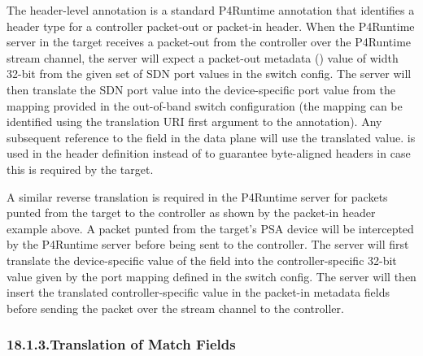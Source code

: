 \documentclass[11pt]{article}
\begin{document}
{%
\noindent{}The header-level annotation  is a standard P4Runtime
annotation that identifies a header type for a controller packet-out or
packet-in header. When the P4Runtime server in the target receives a packet-out
from the controller over the P4Runtime stream channel, the server will expect a
packet-out metadata () value of width 32-bit from the given set of
SDN port values in the switch config. The server will then translate the SDN
port value into the device-specific port value from the mapping provided in the
out-of-band switch configuration (the mapping can be identified using the
translation URI \textemdash{} first argument to the 
annotation). Any subsequent reference to the  field in the
data plane will use the translated value.  is used in the
header definition instead of  to guarantee byte-aligned headers in
case this is required by the target.%

A similar reverse translation is required in the P4Runtime server for packets
punted from the target to the controller as shown by the packet-in header
example above. A packet punted from the target's PSA device will be intercepted
by the P4Runtime server before being sent to the controller. The server will
first translate the device-specific value of the  field into the
controller-specific 32-bit value given by the port mapping defined in the switch
config. The server will then insert the translated controller-specific value in
the packet-in metadata fields before sending the packet over the stream channel
to the controller.%

\subsubsection{18.1.3.\hspace*{0.5em}Translation of Match Fields}\label{sec-translation-of-match-fields}%

}
\end{document}
